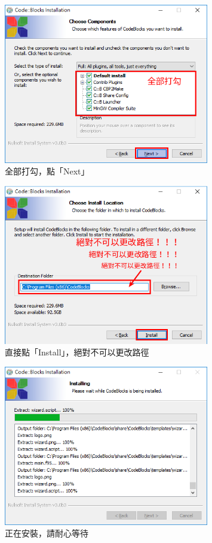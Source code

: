 		\begin{figure}[H]
			\centering
			\includegraphics[width=0.8\textwidth]{fig/install_and_setting/install_006_setup03}
			\caption{全部打勾，點「Next」}
		\end{figure}
	
		\begin{figure}[H]
			\centering
			\includegraphics[width=0.8\textwidth]{fig/install_and_setting/install_007_setup04}
			\caption{直接點「Install」，絕對不可以更改路徑}
		\end{figure}

		\begin{figure}[H]
			\centering
			\includegraphics[width=0.8\textwidth]{fig/install_and_setting/install_008_setup05}
			\caption{正在安裝，請耐心等待}
		\end{figure}
		
